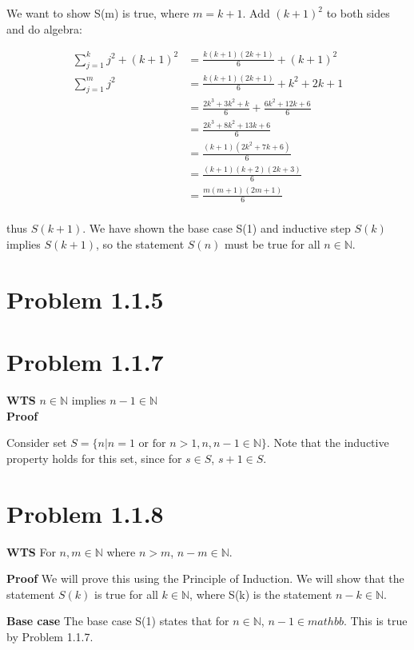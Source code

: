\documentclass[10pt]{article} %
\begin{document}
We want to show S(m) is true, where $m=k+1$. Add $(k+1)^2$ to both sides and do algebra:

\begin{align*}
  \sum_{j=1}^{k} j^2 + (k+1)^2 &= \frac{k(k+1)(2k+1)}{6} + (k+1)^2\\
  \sum_{j=1}^{m} j^2 &= \frac{k(k+1)(2k+1)}{6} + k^2 + 2k + 1\\
  &= \frac{2k^3+3k^2+k}{6} + \frac{6k^2 + 12k + 6}{6}\\
  &= \frac{2k^3+8k^2+13k+6}{6}\\
  &= \frac{(k+1)(2k^2+7k+6)}{6}\\
  &= \frac{(k+1)(k+2)(2k+3)}{6}\\
  &= \frac{m(m+1)(2m+1)}{6}\\
\end{align*}

thus $S(k+1)$. We have shown the base case S(1) and inductive step $S(k)$ implies $S(k+1)$, so the statement $S(n)$ must be true for all $n\in \mathbb{N}$.\\

\section{Problem 1.1.5}

\section{Problem 1.1.7}
\textbf{WTS} $n \in \mathbb{N}$ implies $n-1 \in \mathbb{N}$\\

\textbf{Proof}

Consider set $S = \{n | n = 1 \mbox{ or for } n > 1, n, n-1 \in \mathbb{N}\}$. Note that the inductive property holds for this set, since for $s \in S$, $s+1 \in S$.

\section{Problem 1.1.8}
\textbf{WTS} For $n,m \in \mathbb{N}$ where $n > m$, $n-m \in \mathbb{N}$.

\textbf{Proof} We will prove this using the Principle of Induction. We will show that the statement $S(k)$ is true for all $k\in\mathbb{N}$, where S(k) is the statement $n-k\in\mathbb{N}$.

\textbf{Base case} The base case S(1) states that for $n\in\mathbb{N}$, $n-1\in{mathbb}$. This is true by Problem 1.1.7.\\
\end{document}
